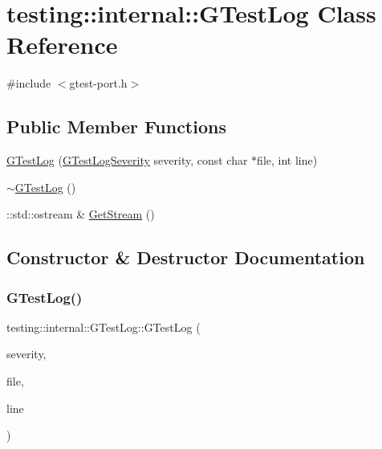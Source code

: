 \hypertarget{classtesting_1_1internal_1_1_g_test_log}{}\section{testing\+::internal\+::G\+Test\+Log Class Reference}
\label{classtesting_1_1internal_1_1_g_test_log}


{\ttfamily \#include $<$gtest-\/port.\+h$>$}

\subsection*{Public Member Functions}
\begin{DoxyCompactItemize}
\item 
\mbox{\hyperlink{classtesting_1_1internal_1_1_g_test_log_a364691bf972983a59cfa2891062a64af}{G\+Test\+Log}} (\mbox{\hyperlink{namespacetesting_1_1internal_aa6255ef3b023c5b4e1a2198d887fb977}{G\+Test\+Log\+Severity}} severity, const char $\ast$file, int line)
\item 
\mbox{\hyperlink{classtesting_1_1internal_1_1_g_test_log_a978a099703bbaa0f380216e8d7ee03d3}{$\sim$\+G\+Test\+Log}} ()
\item 
\+::std\+::ostream \& \mbox{\hyperlink{classtesting_1_1internal_1_1_g_test_log_aebb92e67d98eca69f0347d5121dab27a}{Get\+Stream}} ()
\end{DoxyCompactItemize}


\subsection{Constructor \& Destructor Documentation}
\mbox{\label{classtesting_1_1internal_1_1_g_test_log_a364691bf972983a59cfa2891062a64af}} 
\subsubsection{\texorpdfstring{GTestLog()}{GTestLog()}}
{\footnotesize\ttfamily testing\+::internal\+::\+G\+Test\+Log\+::\+G\+Test\+Log (\begin{DoxyParamCaption}\item[{\mbox{\hyperlink{namespacetesting_1_1internal_aa6255ef3b023c5b4e1a2198d887fb977}{G\+Test\+Log\+Severity}}}]{severity,  }\item[{const char $\ast$}]{file,  }\item[{int}]{line }\end{DoxyParamCaption})}

